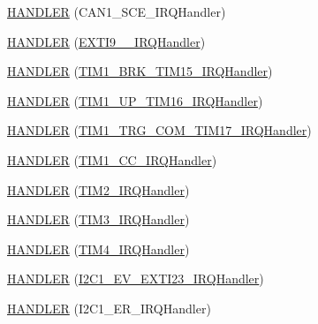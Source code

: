 \begin{DoxyCompactItemize}
\item 
\hyperlink{group___p_i_o_s_gaf3bd936674d03387b3fbc7b23ac49493}{\-H\-A\-N\-D\-L\-E\-R} (\-C\-A\-N1\-\_\-\-S\-C\-E\-\_\-\-I\-R\-Q\-Handler)
\item 
\hyperlink{group___p_i_o_s_ga8e7e5161f04ddaad1a46275ef60af5b3}{\-H\-A\-N\-D\-L\-E\-R} (\hyperlink{group___p_i_o_s___e_x_t_i_ga7b2096b8b2643286dc3a7e5110e5ae85}{\-E\-X\-T\-I9\-\_\-\_\-\-I\-R\-Q\-Handler})
\item 
\hyperlink{group___p_i_o_s_gaef5ecd9aa5c79599d6e13d627bccd933}{\-H\-A\-N\-D\-L\-E\-R} (\hyperlink{group___p_i_o_s___t_i_m_ga37c3c8d5fe4f0106410dea2c1147b8a9}{\-T\-I\-M1\-\_\-\-B\-R\-K\-\_\-\-T\-I\-M15\-\_\-\-I\-R\-Q\-Handler})
\item 
\hyperlink{group___p_i_o_s_gad074af2e425b95b58e889f27da54ae7b}{\-H\-A\-N\-D\-L\-E\-R} (\hyperlink{group___p_i_o_s___t_i_m_gab19e96bc9fe4483b9fdf25047c61238e}{\-T\-I\-M1\-\_\-\-U\-P\-\_\-\-T\-I\-M16\-\_\-\-I\-R\-Q\-Handler})
\item 
\hyperlink{group___p_i_o_s_ga0be5a32ba5788641eb2e9dead9bf6fc0}{\-H\-A\-N\-D\-L\-E\-R} (\hyperlink{group___p_i_o_s___t_i_m_gaa96795d8fb4793f60135fad74ecb1d70}{\-T\-I\-M1\-\_\-\-T\-R\-G\-\_\-\-C\-O\-M\-\_\-\-T\-I\-M17\-\_\-\-I\-R\-Q\-Handler})
\item 
\hyperlink{group___p_i_o_s_gab03e032732f0ad22dc58da2637c4eb07}{\-H\-A\-N\-D\-L\-E\-R} (\hyperlink{group___p_i_o_s___t_i_m_gae8a61b27afdb07c70d6b863c44284ca6}{\-T\-I\-M1\-\_\-\-C\-C\-\_\-\-I\-R\-Q\-Handler})
\item 
\hyperlink{group___p_i_o_s_ga390d635886c3450d24f41c93d01afa93}{\-H\-A\-N\-D\-L\-E\-R} (\hyperlink{group___p_i_o_s___t_i_m_ga38ad4725462bdc5e86c4ead4f04b9fc2}{\-T\-I\-M2\-\_\-\-I\-R\-Q\-Handler})
\item 
\hyperlink{group___p_i_o_s_gaecb039356f5447d178398ce19716a5e5}{\-H\-A\-N\-D\-L\-E\-R} (\hyperlink{group___p_i_o_s___t_i_m_gac8e51d2183b5230cbd5481f8867adce9}{\-T\-I\-M3\-\_\-\-I\-R\-Q\-Handler})
\item 
\hyperlink{group___p_i_o_s_ga69c3c91cb4931a9f27a7ec197bd442eb}{\-H\-A\-N\-D\-L\-E\-R} (\hyperlink{group___p_i_o_s___t_i_m_ga7133f3f78767503641d307386e68bd28}{\-T\-I\-M4\-\_\-\-I\-R\-Q\-Handler})
\item 
\hyperlink{group___p_i_o_s_ga3f576078381cc740c5f4fd50e26d7312}{\-H\-A\-N\-D\-L\-E\-R} (\hyperlink{group___sparky_ga40edacd7797186e686829d1c3b43f4bc}{\-I2\-C1\-\_\-\-E\-V\-\_\-\-E\-X\-T\-I23\-\_\-\-I\-R\-Q\-Handler})
\item 
\hyperlink{group___p_i_o_s_gaa3febcc5f3cd972c88b93057bb941f52}{\-H\-A\-N\-D\-L\-E\-R} (\-I2\-C1\-\_\-\-E\-R\-\_\-\-I\-R\-Q\-Handler)

\end{DoxyCompactItemize}
